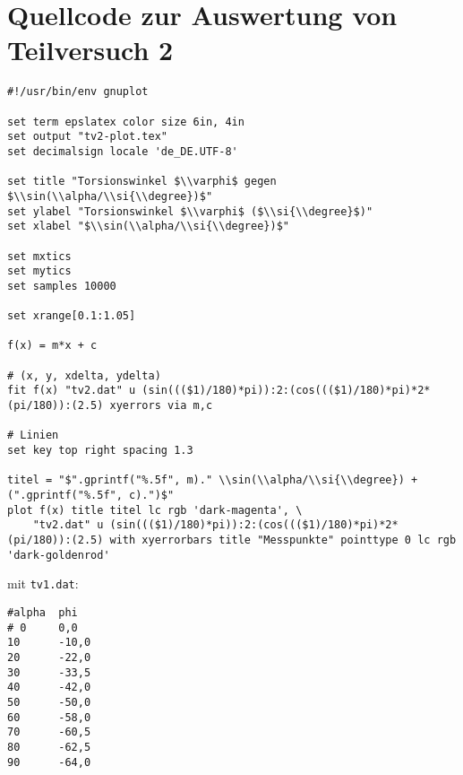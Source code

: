 \section{\gnuplot{} Quellcode zur Auswertung von Teilversuch 2}
    \label{appdx:gnuplottv2}
    {  
        \renewcommand{\fcolorbox}[4][]{#4}
        \begin{verbatim}
#!/usr/bin/env gnuplot

set term epslatex color size 6in, 4in
set output "tv2-plot.tex"
set decimalsign locale 'de_DE.UTF-8'

set title "Torsionswinkel $\\varphi$ gegen $\\sin(\\alpha/\\si{\\degree})$"
set ylabel "Torsionswinkel $\\varphi$ ($\\si{\\degree}$)"
set xlabel "$\\sin(\\alpha/\\si{\\degree})$"

set mxtics
set mytics
set samples 10000

set xrange[0.1:1.05]

f(x) = m*x + c

# (x, y, xdelta, ydelta)
fit f(x) "tv2.dat" u (sin((($1)/180)*pi)):2:(cos((($1)/180)*pi)*2*(pi/180)):(2.5) xyerrors via m,c

# Linien
set key top right spacing 1.3

titel = "$".gprintf("%.5f", m)." \\sin(\\alpha/\\si{\\degree}) + (".gprintf("%.5f", c).")$"
plot f(x) title titel lc rgb 'dark-magenta', \
    "tv2.dat" u (sin((($1)/180)*pi)):2:(cos((($1)/180)*pi)*2*(pi/180)):(2.5) with xyerrorbars title "Messpunkte" pointtype 0 lc rgb 'dark-goldenrod'
        \end{verbatim}
    }
    mit \texttt{tv1.dat}:
    \begin{multicols}{2}
        \begin{verbatim}
#alpha  phi
# 0     0,0
10      -10,0
20      -22,0
30      -33,5
40      -42,0
50      -50,0
60      -58,0
70      -60,5
80      -62,5
90      -64,0
        \end{verbatim}
    \end{multicols}
